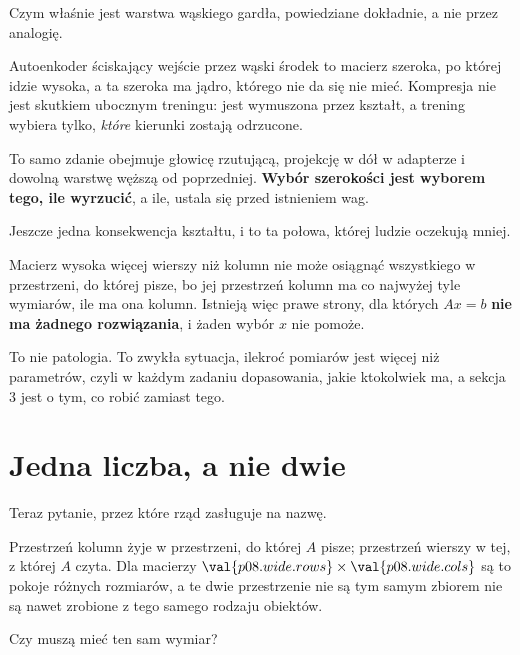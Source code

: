 \begin{fr}
\begin{aibox}
Czym właśnie jest warstwa wąskiego gardła, powiedziane dokładnie, a nie przez
analogię.

Autoenkoder ściskający wejście przez wąski środek to macierz szeroka, po której
idzie wysoka, a ta szeroka ma jądro, którego nie da się nie mieć. Kompresja nie
jest skutkiem ubocznym treningu: jest wymuszona przez kształt, a trening wybiera
tylko, \emph{które} kierunki zostają odrzucone.

To samo zdanie obejmuje głowicę rzutującą, projekcję w dół w adapterze i
dowolną warstwę węższą od poprzedniej. \textbf{Wybór szerokości jest wyborem
tego, ile wyrzucić}, a ile, ustala się przed istnieniem wag.
\end{aibox}
\end{fr}

\begin{fr}
Jeszcze jedna konsekwencja kształtu, i to ta połowa, której ludzie oczekują
mniej.

Macierz wysoka \dash{} więcej wierszy niż kolumn \dash{} nie może osiągnąć
wszystkiego w przestrzeni, do której pisze, bo jej przestrzeń kolumn ma co
najwyżej tyle wymiarów, ile ma ona kolumn. Istnieją więc prawe strony, dla
których $Ax = b$ \textbf{nie ma żadnego rozwiązania}, i żaden wybór $x$ nie
pomoże.

To nie patologia. To zwykła sytuacja, ilekroć pomiarów jest więcej niż
parametrów, czyli w każdym zadaniu dopasowania, jakie ktokolwiek ma, a sekcja 3
jest o tym, co robić zamiast tego.
\end{fr}

\section{Jedna liczba, a nie dwie}
\label{sec:P08-rank}

\begin{fr}
Teraz pytanie, przez które rząd zasługuje na nazwę.

Przestrzeń kolumn żyje w przestrzeni, do której $A$ pisze; przestrzeń wierszy w
tej, z której $A$ czyta. Dla macierzy
$\val{p08.wide.rows} \times \val{p08.wide.cols}$ są to pokoje różnych
rozmiarów, a te dwie przestrzenie nie są tym samym zbiorem \dash{} nie są nawet
zrobione z tego samego rodzaju obiektów.

Czy muszą mieć ten sam wymiar?
\dotline
\nextframe
\end{fr}

